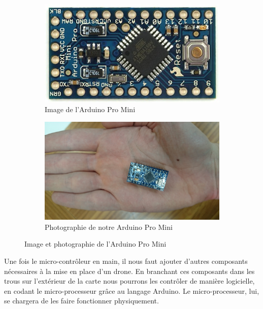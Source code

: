\documentclass[a4paper,10pt]{report}
\begin{document}
	\begin{figure}
	  \begin{subfigure}{.5\textwidth}
	    \centering
	    \includegraphics[scale=0.2]{img/arduinopromini.jpg}
	    \caption{Image de l'Arduino Pro Mini}
	    \label{imagearduino}
	  \end{subfigure}%
	  \begin{subfigure}{.5\textwidth}
	    \centering
	    \includegraphics[scale=0.06]{img/arduino.JPG}
	    \caption{Photographie de notre Arduino Pro Mini}
	    \label{photoarduino}
	  \end{subfigure}
	  \caption{Image et photographie de l'Arduino Pro Mini}
	  \label{arduino}
	\end{figure}
	
      Une fois le micro-contrôleur en main, il nous faut ajouter d'autres 
composants nécessaires à la mise en place d'un drone. En branchant ces 
composants dans les trous sur l'extérieur de la carte nous pourrons les 
contrôler de manière logicielle, en codant le micro-processeur grâce au langage 
Arduino. Le micro-processeur, lui, se chargera de les faire fonctionner 
physiquement.  
	
\end{document}
